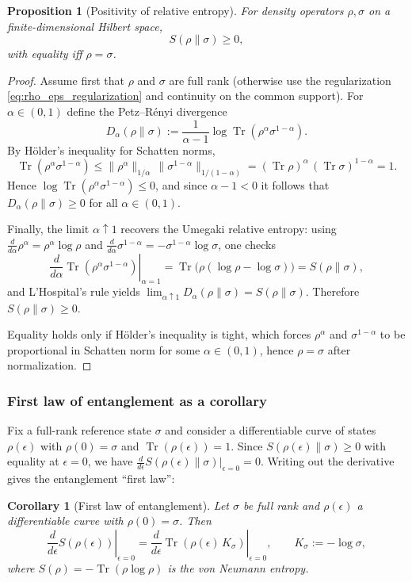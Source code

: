 \documentclass[11pt,oneside]{amsbook}
\numberwithin{equation}{section}
\theoremstyle{plain}
\newtheorem{proposition}[theorem]{Proposition}
\newtheorem{corollary}[theorem]{Corollary}
\theoremstyle{definition}
\theoremstyle{remark}
\DeclareMathOperator{\Tr}{\mathrm{Tr}}
\begin{document}
\begin{proposition}[Positivity of relative entropy]
\label{prop:relative_entropy_positive}
For density operators $\rho,\sigma$ on a finite-dimensional Hilbert space,
\[
S(\rho\|\sigma)\ge 0,
\]
with equality iff $\rho=\sigma$.
\end{proposition}

\begin{proof}
Assume first that $\rho$ and $\sigma$ are full rank (otherwise use the regularization \eqref{eq:rho_eps_regularization} and continuity on the common support).
For $\alpha\in(0,1)$ define the Petz--Rényi divergence
\[
D_\alpha(\rho\|\sigma):=\frac{1}{\alpha-1}\log \Tr(\rho^\alpha \sigma^{1-\alpha}).
\]
By H\"older's inequality for Schatten norms,
\[
\Tr(\rho^\alpha \sigma^{1-\alpha})
\le \|\rho^\alpha\|_{1/\alpha}\,\|\sigma^{1-\alpha}\|_{1/(1-\alpha)}
= (\Tr\rho)^\alpha\,(\Tr\sigma)^{1-\alpha}
= 1.
\]
Hence $\log \Tr(\rho^\alpha \sigma^{1-\alpha})\le 0$, and since $\alpha-1<0$ it follows that $D_\alpha(\rho\|\sigma)\ge 0$ for all $\alpha\in(0,1)$.

Finally, the limit $\alpha\uparrow 1$ recovers the Umegaki relative entropy:
using $\frac{d}{d\alpha}\rho^\alpha=\rho^\alpha\log\rho$ and $\frac{d}{d\alpha}\sigma^{1-\alpha}=-\sigma^{1-\alpha}\log\sigma$, one checks
\[
\left.\frac{d}{d\alpha}\Tr(\rho^\alpha \sigma^{1-\alpha})\right|_{\alpha=1}
=\Tr\bigl(\rho(\log\rho-\log\sigma)\bigr)=S(\rho\|\sigma),
\]
and L'Hospital's rule yields $\lim_{\alpha\uparrow 1}D_\alpha(\rho\|\sigma)=S(\rho\|\sigma)$.
Therefore $S(\rho\|\sigma)\ge 0$.

Equality holds only if H\"older's inequality is tight, which forces $\rho^\alpha$ and $\sigma^{1-\alpha}$ to be proportional in Schatten norm for some $\alpha\in(0,1)$, hence $\rho=\sigma$ after normalization.
\end{proof}

\subsubsection{First law of entanglement as a corollary}
Fix a full-rank reference state $\sigma$ and consider a differentiable curve of states $\rho(\epsilon)$ with $\rho(0)=\sigma$ and $\Tr(\rho(\epsilon))=1$.
Since $S(\rho(\epsilon)\|\sigma)\ge 0$ with equality at $\epsilon=0$, we have $\frac{d}{d\epsilon}S(\rho(\epsilon)\|\sigma)\big|_{\epsilon=0}=0$.
Writing out the derivative gives the entanglement ``first law'':

\begin{corollary}[First law of entanglement]
\label{cor:first_law_entanglement}
Let $\sigma$ be full rank and $\rho(\epsilon)$ a differentiable curve with $\rho(0)=\sigma$.
Then
\[
\left.\frac{d}{d\epsilon}S(\rho(\epsilon))\right|_{\epsilon=0}
=
\left.\frac{d}{d\epsilon}\Tr(\rho(\epsilon)\,K_\sigma)\right|_{\epsilon=0},
\qquad K_\sigma:=-\log\sigma,
\]
where $S(\rho)=-\Tr(\rho\log\rho)$ is the von Neumann entropy.
\end{corollary}
\end{document}
